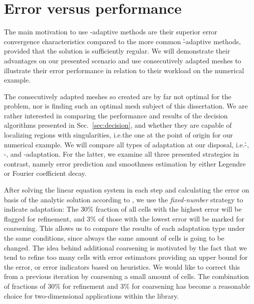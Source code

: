 \section{Error versus performance}
\label{sec:errorvsperformance}



The main motivation to use \hp-adaptive methods are their superior error convergence characteristics compared to the more common \h-adaptive methods, provided that the solution is sufficiently regular. We will demonstrate their advantages on our presented scenario and use consecutively adapted meshes to illustrate their error performance in relation to their workload on the numerical example.


The consecutively adapted meshes so created are by far not optimal for the problem, nor is finding such an optimal mesh subject of this dissertation. We are rather interested in comparing the performance and results of the decision algorithms presented in Sec.~\ref{sec:decision}, and whether they are capable of localizing regions with singularities, i.e.\@ the one at the point of origin for our numerical example. We will compare all types of adaptation at our disposal, i.e.\@ \h-, \p-, and \hp-adaptation. For the latter, we examine all three presented strategies in contrast, namely error prediction and smoothness estimation by either Legendre or Fourier coefficient decay.

After solving the linear equation system in each step and calculating the error on basis of the analytic solution according to \textcite{kelly1983,davydov2017}, we use the \textit{fixed-number} strategy to indicate adaptation: The 30\% fraction of all cells with the highest error will be flagged for refinement, and 3\% of those with the lowest error will be marked for coarsening. This allows us to compare the results of each adaptation type under the same conditions, since always the same amount of cells is going to be changed. The idea behind additional coarsening is motivated by the fact that we tend to refine too many cells with error estimators providing an upper bound for the error, or error indicators based on heuristics. We would like to correct this from a previous iteration by coarsening a small amount of cells. The combination of fractions of 30\% for refinement and 3\% for coarsening has become a reasonable choice for two-dimensional applications within the \dealii{} library.

